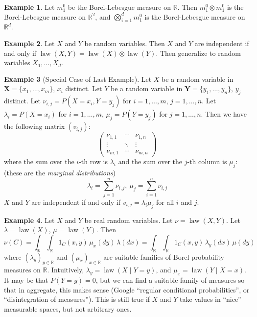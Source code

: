 \documentclass{article}
\DeclareMathOperator{\law}{law}
\newcommand{\R}{\mathbb{R}}
\theoremstyle{definition}
\newtheorem*{example}{Example}
\begin{document}
\begin{example}
Let $m^0_1$ be the Borel-Lebesgue measure on $\R$. Then $m^0_1 \otimes m^0_1$ is the Borel-Lebesgue measure on $\R^2$, and $\bigotimes_{i=1}^d m^0_1$ is the Borel-Lebesgue measure on $\R^d$.
\end{example}

\begin{example}
Let $X$ and $Y$ be random variables. Then $X$ and $Y$ are independent if and only if $\law(X,Y) = \law(X) \otimes \law(Y)$. Then generalize to random variables $X_1, \dots, X_d$.
\end{example}

\begin{example}[Special Case of Last Example]
Let $X$ be a random variable in $\mathbf{X} = \{x_1, \dots, x_m\}$, $x_i$ distinct. Let $Y$ be a random variable in $\mathbf{Y} = \{y_1, \dots, y_n\}$, $y_j$ distinct.
Let $\nu_{i,j} = P(X = x_i, Y = y_j)$ for $i = 1, \dots, m$, $j = 1, \dots, n$. Let $\lambda_i = P(X = x_i)$ for $i = 1, \dots, m$, $\mu_j = P(Y = y_j)$ for $j = 1, \dots, n$. Then we have the following matrix $(v_{i,j})$:
\[
    \begin{pmatrix}
    \nu_{1,1} & \cdots & \nu_{1,n} \\
    \vdots & \ddots & \vdots \\
    \nu_{m,1} & \cdots & \nu_{m,n}
    \end{pmatrix}
\]
where the sum over the $i$-th row is $\lambda_i$ and the sum over the $j$-th column is $\mu_j$: (these are the \emph{marginal distributions})
\[
    \lambda_i = \sum_{j=1}^{n} \nu_{i,j}, \ \mu_j = \sum_{i=1}^n \nu_{i,j}
\]
$X$ and $Y$ are independent if and only if $v_{i,j} = \lambda_i \mu_j$ for all $i$ and $j$.
\end{example}

\begin{example}
Let $X$ and $Y$ be real random variables. Let $\nu = \law(X,Y)$. Let $\lambda = \law(X)$, $\mu = \law(Y)$. Then
\[
    \nu(C) = \int_\R \int_\R 1_C(x,y) \,\mu_x(dy)\,\lambda(dx) = \int_\R \int_\R 1_C(x,y) \,\lambda_y(dx)\,\mu(dy)
\]
where $(\lambda_y)_{y \in \R}$ and $(\mu_x)_{x \in \R}$ are suitable families of Borel probability measures on $\R$. Intuitively, $\lambda_y = \law(X \mid Y = y)$, and $\mu_x = \law(Y \mid X = x)$. It may be that $P(Y = y) = 0$, but we can find a suitable family of measures so that in aggregate, this makes sense (Google ``regular conditional probabilities'', or ``disintegration of measures''). This is still true if $X$ and $Y$ take values in ``nice'' measurable spaces, but not arbitrary ones.
\end{example}
\end{document}
